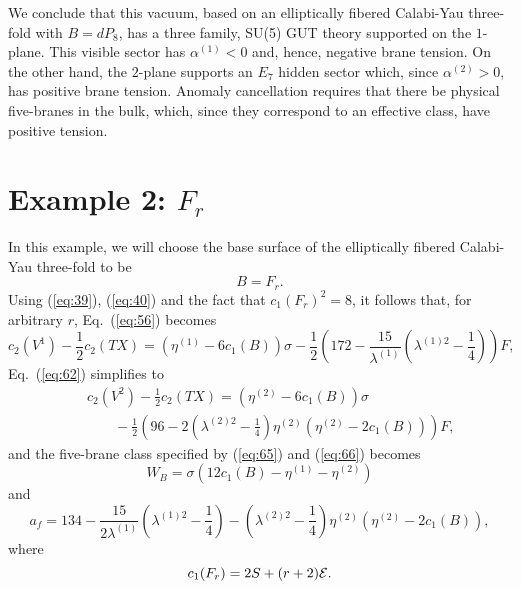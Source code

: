 \documentclass[a4paper,12pt]{article}
\numberwithin{equation}{section}
\theoremstyle{plain}
\begin{document}
We conclude that this vacuum, based on an elliptically fibered Calabi-Yau
three-fold with $B=dP_{8}$, has a three family, SU(5) GUT theory supported on
the $1$-plane. This visible sector has $\alpha^{(1)}<0$ and, hence, negative
brane tension. On the other hand, the $2$-plane supports an $E_{7}$ hidden sector
which, since $\alpha^{(2)}>0$, has positive brane tension. Anomaly
cancellation requires that there be physical five-branes in the bulk, which,
since they correspond to an effective class, have positive tension.


\section*{Example 2: $F_{r}$}

In this example, we will choose the base surface of the elliptically fibered
Calabi-Yau three-fold to be
%
\begin{equation}
B=F_{r}.
\label{eq:84}
\end{equation}
%
Using (\ref{eq:39}), (\ref{eq:40}) and the fact that $c_{1}(F_{r})^{2}=8$, it
follows that, for arbitrary $r$, Eq.~(\ref{eq:56}) becomes 
%
\begin{equation}
c_{2}(V^{1})-\frac{1}{2}c_{2}(TX)=(\eta^{(1)}-6c_{1}(B))\sigma
-\frac{1}{2}\left(172-\frac{15}{\lambda^{(1)}}
\left(\lambda^{(1)2}-\frac{1}{4}\right)\right)F,
\label{eq:85}
\end{equation}
%
Eq.~(\ref{eq:62}) simplifies to
%
\begin{eqnarray}
\nonumber
& & c_{2}(V^{2})-\frac{1}{2}c_{2}(TX)=(\eta^{(2)}-6c_{1}(B))\sigma \\
& & \;\;\;\;\;\;\;-\frac{1}{2}\left(96-2\left(\lambda^{(2)2}
-\frac{1}{4}\right)\eta^{(2)}(\eta^{(2)}-2c_{1}(B))\right)F,
\label{eq:86}
\end{eqnarray}
%
and the five-brane class specified by (\ref{eq:65}) and (\ref{eq:66}) becomes
%
\begin{equation}
W_{B}=\sigma(12c_{1}(B)-\eta^{(1)}-\eta^{(2)})
\label{eq:87}
\end{equation}
%
and
%
\begin{equation}
a_{f}= 134
-\frac{15}{2\lambda^{(1)}}\left(\lambda^{(1)2}-\frac{1}{4}\right)
-\left(\lambda^{(2)2}-\frac{1}{4}\right)\eta^{(2)}(\eta^{(2)}-2c_{1}(B)),
\label{eq:88}
\end{equation}
%
where
%
\begin{equation}
c_{1}(F_{r})=2S+(r+2){\cal{E}}.
\label{eq:89}
\end{equation}
%
\end{document}

